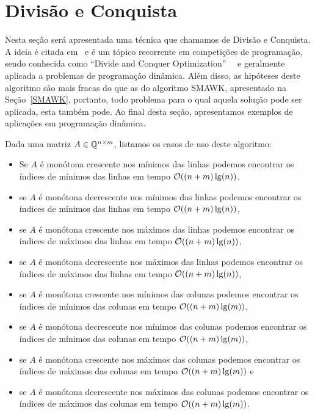 \section{Divisão e Conquista}
\label{DivisaoEConquista}


Nesta seção será apresentada uma técnica que chamamos de Divisão e Conquista. A ideia é citada em~\cite{Aggarwal:1987} e é um tópico recorrente em competições de programação, sendo conhecida como ``Divide and Conquer Optimization''~\cite{Quora:DivConq}~\cite{CF:Optm} e geralmente aplicada a problemas de programação dinâmica. Além disso, as hipóteses deste algoritmo são mais fracas do que as do algoritmo SMAWK, apresentado na Seção~\ref{SMAWK}, portanto, todo problema para o qual aquela solução pode ser aplicada, esta também pode. Ao final desta seção, apresentamos exemplos de aplicações em programação dinâmica.  

Dada uma matriz $A \in \mathbb{Q}^{n \times m}$, listamos os casos de uso deste algoritmo:
\begin{itemize}
    \item Se $A$ é monótona crescente nos mínimos das linhas podemos encontrar os índices de mínimos das linhas em tempo $\mathcal{O}((n+m)\lg(n))$, 
    \item se $A$ é monótona decrescente nos mínimos das linhas podemos encontrar os índices de mínimos das linhas em tempo $\mathcal{O}((n+m)\lg(n))$, 
    \item se $A$ é monótona crescente nos máximos das linhas podemos encontrar os índices de máximos das linhas em tempo $\mathcal{O}((n+m)\lg(n))$, 
    \item se $A$ é monótona decrescente nos máximos das linhas podemos encontrar os índices de máximos das linhas em tempo $\mathcal{O}((n+m)\lg(n))$, 
    \item se $A$ é monótona crescente nos mínimos das colunas podemos encontrar os índices de mínimos das colunas em tempo $\mathcal{O}((n+m)\lg(m))$, 
    \item se $A$ é monótona decrescente nos mínimos das colunas podemos encontrar os índices de mínimos das colunas em tempo $\mathcal{O}((n+m)\lg(m))$, 
    \item se $A$ é monótona crescente nos máximos das colunas podemos encontrar os índices de máximos das colunas em tempo $\mathcal{O}((n+m)\lg(m))$ e 
    \item se $A$ é monótona decrescente nos máximos das colunas podemos encontrar os índices de máximos das colunas em tempo $\mathcal{O}((n+m)\lg(m))$.
\end{itemize}

